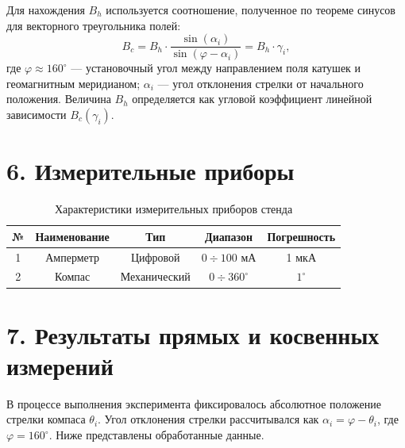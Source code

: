 \documentclass[a4paper,12pt]{article}
\begin{document}
Для нахождения $B_h$ используется соотношение, полученное по теореме синусов для векторного треугольника полей:
\begin{equation}
    B_c = B_h \cdot \frac{\sin(\alpha_i)}{\sin(\varphi - \alpha_i)} = B_h \cdot \gamma_i,
    \label{eq:bh_calc}
\end{equation}
где $\varphi \approx 160^\circ$ — установочный угол между направлением поля катушек и геомагнитным меридианом; $\alpha_i$ — угол отклонения стрелки от начального положения. Величина $B_h$ определяется как угловой коэффициент линейной зависимости $B_c(\gamma_i)$.

\section*{\hspace{30pt}6. Измерительные приборы}
\begin{table}[H]
    \caption{Характеристики измерительных приборов стенда}
    \label{tab:devices}
    \centering
    \begin{tabular}{|c|c|c|c|c|}
        \hline
        № & Наименование & Тип & Диапазон & Погрешность \\ \hline
        1 & Амперметр & Цифровой & $0 \div 100$ мА & 1 мкА  \\ \hline
        2 & Компас & Механический & $0 \div 360^\circ$ & $1^\circ$  \\ \hline
    \end{tabular}
\end{table}

\section*{\hspace{30pt}7. Результаты прямых и косвенных измерений}
\hspace{15pt} В процессе выполнения эксперимента фиксировалось абсолютное положение стрелки компаса $\theta_i$. Угол отклонения стрелки рассчитывался как $\alpha_i = \varphi - \theta_i$, где $\varphi = 160^\circ$. Ниже представлены обработанные данные.
\end{document}
